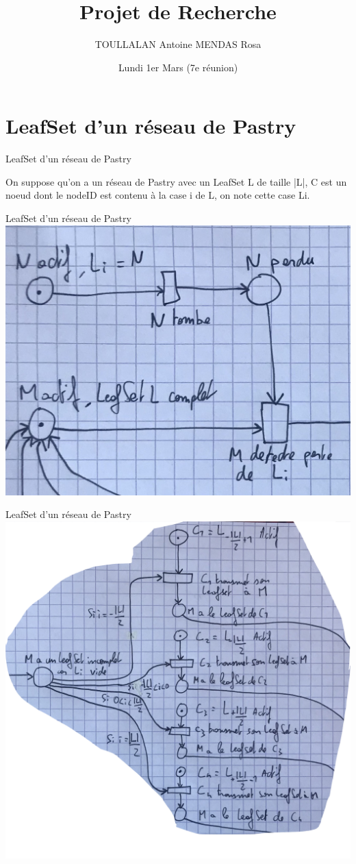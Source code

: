 \documentclass[french]{beamer}
\title{Projet de Recherche}
\author[]{TOULLALAN Antoine MENDAS Rosa}
\date{Lundi 1er Mars (7e réunion)}
\begin{document}
 \section{LeafSet d'un réseau de Pastry}
\begin{frame}{LeafSet d'un réseau de Pastry}
\begin{Large}
On suppose qu'on a un réseau de Pastry avec un LeafSet L de taille |L|, C est un noeud dont le nodeID est contenu à la case i de L, on note cette case Li.
\end{Large}
 \end{frame}
 \begin{frame}{LeafSet d'un réseau de Pastry}
 \includegraphics[scale=0.2]{partie1.jpg}
 \end{frame}
 \begin{frame}{LeafSet d'un réseau de Pastry}
 \includegraphics[scale=0.11]{partie2.png}
 \end{frame}
\end{document}

